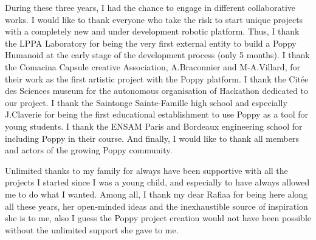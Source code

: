 During these three years, I had the chance to engage in different collaborative works. I would like to thank everyone who take the risk to start unique projects with a completely new and under development robotic platform. Thus, I thank the LPPA Laboratory for being the very first external entity to build a Poppy Humanoid at the early stage of the development process (only 5 months).
I thank the Comacina Capsule creative Association, A.Braconnier and M-A.Villard, for their work as the first artistic project with the Poppy platform. I thank the Citée des Sciences museum for the autonomous organisation of Hackathon dedicated to our project. I thank the Saintonge Sainte-Famille high school and especially J.Claverie for being the first educational establishment to use Poppy as a tool for young students. I thank the ENSAM Paris and Bordeaux engineering school for including Poppy in their course.
And finally, I would like to thank all members and actors of the growing Poppy community.


Unlimited thanks to my family for always have been supportive with all the projects I started since I was a young child, and especially to have always allowed me to do what I wanted. Among all, I thank my dear Rafiaa for being here along all these years, her open-minded ideas and the inexhaustible source of inspiration she is to me, also I guess the Poppy project creation would not have been possible without the unlimited support she gave to me.
